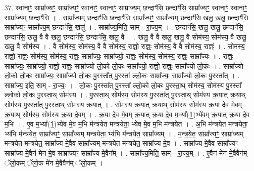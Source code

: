 \documentclass[17pt]{extarticle}
\begin{document}
37. स्वानाꣳ॒॒ साम्रा᳚ज्यꣳ॒॒ साम्रा᳚ज्यꣳ॒॒ स्वानाꣳ॒॒ स्वानाꣳ॒॒ साम्रा᳚ज्य॒म् छन्दाꣳ॑सि॒ छन्दाꣳ॑सि॒ साम्रा᳚ज्यꣳ॒॒ स्वानाꣳ॒॒ स्वानाꣳ॒॒ साम्रा᳚ज्य॒म् छन्दाꣳ॑सि । . साम्रा᳚ज्य॒म् छन्दाꣳ॑सि॒ छन्दाꣳ॑सि॒ साम्रा᳚ज्यꣳ॒॒ साम्रा᳚ज्य॒म् छन्दाꣳ॑सि॒ खलु॒ खलु॒ छन्दाꣳ॑सि॒ साम्रा᳚ज्यꣳ॒॒ साम्रा᳚ज्य॒म् छन्दाꣳ॑सि॒ खलु॑ । . साम्रा᳚ज्य॒मिति॒ साम् - रा॒ज्य॒म् । . छन्दाꣳ॑सि॒ खलु॒ खलु॒ छन्दाꣳ॑सि॒ छन्दाꣳ॑सि॒ खलु॒ वै वै खलु॒ छन्दाꣳ॑सि॒ छन्दाꣳ॑सि॒ खलु॒ वै । . खलु॒ वै वै खलु॒ खलु॒ वै सोम॑स्य॒ सोम॑स्य॒ वै खलु॒ खलु॒ वै सोम॑स्य । . वै सोम॑स्य॒ सोम॑स्य॒ वै वै सोम॑स्य॒ राज्ञो॒ राज्ञ्ः॒ सोम॑स्य॒ वै वै सोम॑स्य॒ राज्ञ्ः॑ । . सोम॑स्य॒ राज्ञो॒ राज्ञ्ः॒ सोम॑स्य॒ सोम॑स्य॒ राज्ञ्ः॒ साम्रा᳚ज्यः॒ साम्रा᳚ज्यो॒ राज्ञ्ः॒ सोम॑स्य॒ सोम॑स्य॒ राज्ञ्ः॒ साम्रा᳚ज्यः । . राज्ञ्ः॒ साम्रा᳚ज्यः॒ साम्रा᳚ज्यो॒ राज्ञो॒ राज्ञ्ः॒ साम्रा᳚ज्यो लो॒को लो॒कः साम्रा᳚ज्यो॒ राज्ञो॒ राज्ञ्ः॒ साम्रा᳚ज्यो लो॒कः । . साम्रा᳚ज्यो लो॒को लो॒कः साम्रा᳚ज्यः॒ साम्रा᳚ज्यो लो॒कः पु॒रस्ता᳚त् पु॒रस्ता᳚ ल्लो॒कः साम्रा᳚ज्यः॒ साम्रा᳚ज्यो लो॒कः पु॒रस्ता᳚त् । . साम्रा᳚ज्य॒ इति॒ साम् - रा॒ज्यः॒ । . लो॒कः पु॒रस्ता᳚त् पु॒रस्ता᳚ ल्लो॒को लो॒कः पु॒रस्ता॒थ् सोम॑स्य॒ सोम॑स्य पु॒रस्ता᳚ ल्लो॒को लो॒कः पु॒रस्ता॒थ् सोम॑स्य । . पु॒रस्ता॒थ् सोम॑स्य॒ सोम॑स्य पु॒रस्ता᳚त् पु॒रस्ता॒थ् सोम॑स्य क्र॒यात् क्र॒याथ् सोम॑स्य पु॒रस्ता᳚त् पु॒रस्ता॒थ् सोम॑स्य क्र॒यात् । . सोम॑स्य क्र॒यात् क्र॒याथ् सोम॑स्य॒ सोम॑स्य क्र॒या दे॒व मे॒वम् क्र॒याथ् सोम॑स्य॒ सोम॑स्य क्र॒या दे॒वम् । . क्र॒या दे॒व मे॒वम् क्र॒यात् क्र॒या दे॒व म॒भ्या᳚(1॒)भ्ये॑वम् क्र॒यात् क्र॒या दे॒व म॒भि । . ए॒व म॒भ्या᳚(1॒)भ्ये॑व मे॒व म॒भि म॑न्त्रयेत मन्त्रयेता॒ भ्ये॑व मे॒व म॒भि म॑न्त्रयेत । . अ॒भि म॑न्त्रयेत मन्त्रयेता॒ भ्य॑भि म॑न्त्रयेत॒ साम्रा᳚ज्यꣳ॒॒ साम्रा᳚ज्यम् मन्त्रयेता॒ भ्य॑भि म॑न्त्रयेत॒ साम्रा᳚ज्यम् । . म॒न्त्र॒ये॒त॒ साम्रा᳚ज्यꣳ॒॒ साम्रा᳚ज्यम् मन्त्रयेत मन्त्रयेत॒ साम्रा᳚ज्य मे॒वैव साम्रा᳚ज्यम् मन्त्रयेत मन्त्रयेत॒ साम्रा᳚ज्य मे॒व । . साम्रा᳚ज्य मे॒वैव साम्रा᳚ज्यꣳ॒॒ साम्रा᳚ज्य मे॒वैन॑ मेन मे॒व साम्रा᳚ज्यꣳ॒॒ साम्रा᳚ज्य मे॒वैन᳚म् । . साम्रा᳚ज्य॒मिति॒ साम् - रा॒ज्य॒म् । . ए॒वैन॑ मेन मे॒वैवैन॑म् ॅलो॒कम् ॅलो॒क मे॑न मे॒वैवैन॑म् ॅलो॒कम् । \newline
\pagebreak
{}
\end{document}
